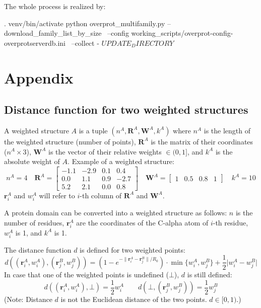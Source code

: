 \documentclass{article}
\begin{document}
The whole process is realized by:

\begin{codeblock}
  . venv/bin/activate
  python  overprot_multifamily.py  --download_family_list_by_size \
      --config working_scripts/overprot-config-overprotserverdb.ini \
      --collect  -  $UPDATE_DIRECTORY                                                           $
\end{codeblock}



\section{Appendix} 
\label{sec:appendix}



\subsection{Distance function for two weighted structures}
\label{sec:appendix_ws_distance}

A weighted structure \(A\) is a tuple
\( (n^A, \mathbf{R}^A, \mathbf{W}^A, k^A) \) where \(n^A\) is the length
of the weighted structure (number of points), \(\mathbf{R}^A\) is the
matrix of their coordinates (\(n^A \times 3\)), \(\mathbf{W}^A\) is the
vector of their relative weights \(\in (0,1]\), and \(k^A\) is the
absolute weight of \(A\). Example of a weighted structure:
  \[
    n^A = 4 \quad
    \mathbf{R}^A = \begin{bmatrix}-1.1&-2.9&0.1&0.4\\0.0&1.1&0.9&-2.7\\5.2&2.1&0.0&0.8\end{bmatrix} \quad
    \mathbf{W}^A = \begin{bmatrix}1&0.5&0.8&1\end{bmatrix} \quad
    k^A = 10
  \]
\(\mathbf{r}^A_i\) and \(w^A_i\) will refer to \(i\)-th column of
\(\mathbf{R}^A\) and \(\mathbf{W}^A\).

A protein domain can be converted into a weighted structure as follows:
\(n\) is the number of residues, \(\mathbf{r}^A_i\) are the coordinates of the
C-alpha atom of \(i\)-th residue, \(w^A_i\) is 1, and \(k^A\) is 1.

The distance function \(d\) is defined for two weighted points:
  \[
    d \left( (\mathbf{r}^A_i, w^A_i), (\mathbf{r}^B_j, w^B_j) \right) 
    = \left( 1 - e^{-\lVert \mathbf{r}^A_i-\mathbf{r}^B_j \rVert / R_0} \right) \cdot \min\{ w^A_i, w^B_j \} + \frac{1}{2} \lvert w^A_i-w^B_j \rvert
  \]
In case that one of the weighted points is undefined (\(\bot\)), \(d\)
is still defined:
  \[
    d \left( (\mathbf{r}^A_i, w^A_i), \bot \right) = \frac{1}{2} w^A_i \qquad 
    d \left( \bot, (\mathbf{r}^B_j, w^B_j) \right) = \frac{1}{2} w^B_j
  \]
(Note: Distance \(d\) is not the Euclidean distance of the two points.
\(d \in [0,1)\).)
\end{document}
